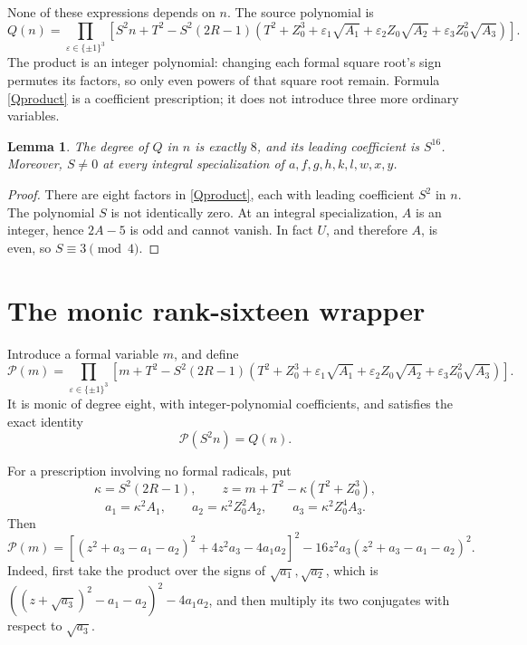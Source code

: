 \documentclass[11pt]{article}
\newtheorem{lemma}[theorem]{Lemma}
\begin{document}
None of these expressions depends on \(n\).  The source polynomial is
\begin{equation}\label{Qproduct}
 Q(n)=
 \prod_{\varepsilon\in\{\pm1\}^3}
 \left[
 S^2n+T^2
 -S^2(2R-1)\left(
 T^2+Z_0^3+
 \varepsilon_1\sqrt{A_1}
 +\varepsilon_2Z_0\sqrt{A_2}
 +\varepsilon_3Z_0^2\sqrt{A_3}
 \right)\right].
\end{equation}
The product is an integer polynomial: changing each formal square
root's sign permutes its factors, so only even powers of that square
root remain.  Formula \eqref{Qproduct} is a coefficient prescription;
it does not introduce three more ordinary variables.

\begin{lemma}\label{leading}
The degree of \(Q\) in \(n\) is exactly \(8\), and its leading
coefficient is \(S^{16}\).  Moreover, \(S\ne0\) at every integral
specialization of \(a,f,g,h,k,l,w,x,y\).
\end{lemma}
\begin{proof}
There are eight factors in \eqref{Qproduct}, each with leading
coefficient \(S^2\) in \(n\).  The polynomial \(S\) is not identically
zero.  At an integral specialization, \(A\) is an integer, hence
\(2A-5\) is odd and cannot vanish.  In fact \(U\), and therefore \(A\),
is even, so \(S\equiv3\pmod4\).
\end{proof}

\section{The monic rank-sixteen wrapper}

Introduce a formal variable \(m\), and define
\begin{equation}\label{Pm}
 \mathcal P(m)=
 \prod_{\varepsilon\in\{\pm1\}^3}
 \left[
 m+T^2
 -S^2(2R-1)\left(
 T^2+Z_0^3+
 \varepsilon_1\sqrt{A_1}
 +\varepsilon_2Z_0\sqrt{A_2}
 +\varepsilon_3Z_0^2\sqrt{A_3}
 \right)\right].
\end{equation}
It is monic of degree eight, with integer-polynomial coefficients,
and satisfies the exact identity
\begin{equation}\label{Pidentity}
                         \mathcal P(S^2n)=Q(n).
\end{equation}

For a prescription involving no formal radicals, put
\[
 \kappa=S^2(2R-1),\qquad z=m+T^2-\kappa(T^2+Z_0^3),
\]
\[
 a_1=\kappa^2A_1,\qquad
 a_2=\kappa^2Z_0^2A_2,\qquad
 a_3=\kappa^2Z_0^4A_3.
\]
Then
\begin{equation}\label{radicalfree}
 \mathcal P(m)=
 \left[(z^2+a_3-a_1-a_2)^2+4z^2a_3-4a_1a_2\right]^2
 -16z^2a_3(z^2+a_3-a_1-a_2)^2.
\end{equation}
Indeed, first take the product over the signs of
\(\sqrt{a_1},\sqrt{a_2}\), which is
\(((z+\sqrt{a_3})^2-a_1-a_2)^2-4a_1a_2\), and then multiply
its two conjugates with respect to \(\sqrt{a_3}\).
\end{document}
